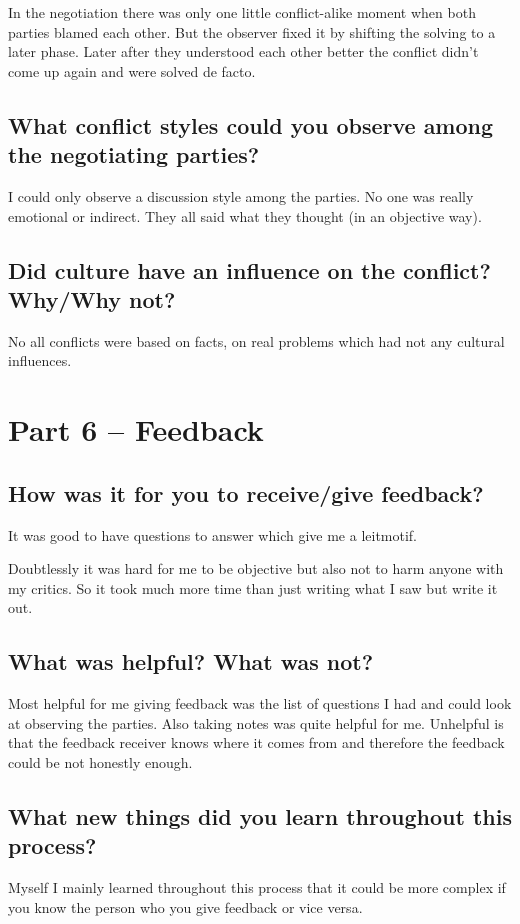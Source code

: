 \documentclass[11pt,fleqn]{book} %
\begin{document}
In the negotiation there was only one little conflict-alike moment when both parties blamed each other. But the observer fixed it by shifting the solving to a later phase. Later after they understood each other better the conflict didn't come up again and were solved de facto.

\subsection{What conflict styles could you observe among the negotiating parties?}
I could only observe a discussion style among the parties. No one was really emotional or indirect. They all said what they thought (in an objective way).

\subsection{Did culture have an influence on the conflict? Why/Why not?}
No all conflicts were based on facts, on real problems which had not any cultural influences.

\section{Part 6 – Feedback}
\subsection{How was it for you to receive/give feedback?}
It was good to have questions to answer which give me a leitmotif.

Doubtlessly it was hard for me to be objective but also not to harm anyone with my critics. So it took much more time than just writing what I saw but write it out.

\subsection{What was helpful? What was not?}
Most helpful for me giving feedback was the list of questions I had and could look at observing the parties. Also taking notes was quite helpful for me. Unhelpful is that the feedback receiver knows where it comes from and therefore the feedback could be not honestly enough.

\subsection{What new things did you learn throughout this process?}
Myself I  mainly learned throughout this process that it could be more complex if you know the person who you give feedback or vice versa.
\end{document}
